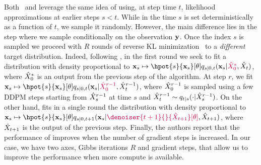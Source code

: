 Both \algo\ and {} leverage the same idea of using, at step time $t$, likelihood approximations at earlier steps $s < t$. While in {} the time $s$ is set deterministically as a function of $t$, we sample it randomly. However, the main difference lies in the step where we sample conditionally on the observation ${\mathbf{y}}$. Once the index $s$ is sampled we proceed with $R$ rounds of reverse KL minimization \wrt\ to a \emph{different} target distribution. Indeed, following , in the first round we seek to fit a distribution with density proportional to $\bx_s \mapsto \hpot{s}{\bx_s}[\param] \fw{s|0, t}{\textcolor{purple}{\vX^* _0}, \vX_t}{\bx_s}$, where $\hat{X}^* _0$ is an output from the previous step of the algorithm. 
At step $r$, we fit $\bx_s \mapsto \hpot{s}{\bx_s}[\param] \fw{s|0, t}{\textcolor{purple}{\vX^{r-1} _0}, \vX^{r-1} _t}{\bx_s}$, where $\hat{X}^{r-1} _0$ is sampled using a few DDPM steps starting from $\hat{X}^{r-1} _s$ at time $s$ and $\vX^{r-1} _t \sim \fw{t|s}{\vX^{r-1} _s}{}$. On the other hand, {} fits in a single round the distribution with density proportional to $\bx_s \mapsto \hpot{s}{\bx_s}[\param] \fw{s|0, t+1}{\textcolor{purple}{\denoiser{t+1}{}{\vX_{t+1}}[\param]}, \vX_{t+1}}{\bx_s}$, where $\hat{X}_{t+1}$ is the output of the previous step. Finally, the authors report that the performance of {} improves when the number of gradient steps is increased. In our case, we have two axes, Gibbs iterations $R$ and gradient steps, that allow us to improve the performance when more compute is available. 
